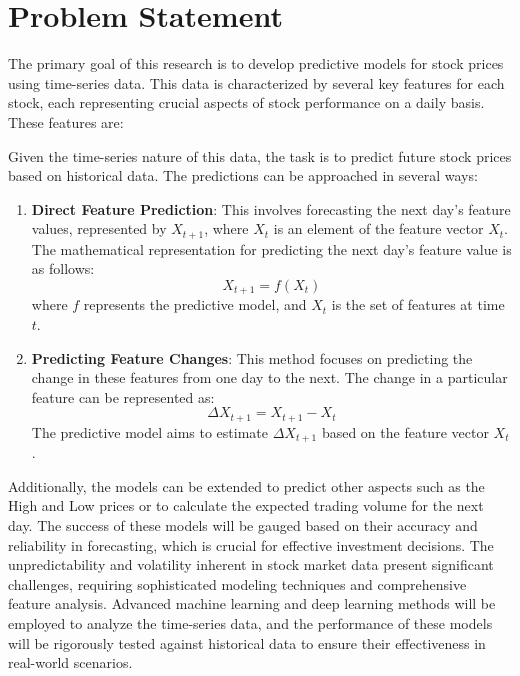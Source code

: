 \documentclass[10pt,twocolumn,letterpaper]{article}
\begin{document}
\section{Problem Statement}
\label{sec:ps}
The primary goal of this research is to develop predictive models for stock prices using time-series data.
This data is characterized by several key features for each stock, each representing crucial aspects of stock performance on a daily basis.
These features are:

Given the time-series nature of this data, the task is to predict future stock prices based on historical data.
The predictions can be approached in several ways:

\begin{enumerate}
	\item \textbf{Direct Feature Prediction}: This involves forecasting the next day's feature values, represented by \( X_{t+1} \), where \( X_{t} \) is an element of the feature vector \( X_{t} \).
	      The mathematical representation for predicting the next day's feature value is as follows:
	      \[
		      X_{t+1} = f(X_t)
	      \]
	      where \( f \) represents the predictive model, and \( X_t \) is the set of features at time \( t \).

	\item \textbf{Predicting Feature Changes}: This method focuses on predicting the change in these features from one day to the next.
	      The change in a particular feature can be represented as:
	      \[
		      \Delta X_{t+1} = X_{t+1} - X_t
	      \]
	      The predictive model aims to estimate \( \Delta X_{t+1} \) based on the feature vector \( X_t \).
\end{enumerate}

Additionally, the models can be extended to predict other aspects such as the High and Low prices or to calculate the expected trading volume for the next day.
The success of these models will be gauged based on their accuracy and reliability in forecasting, which is crucial for effective investment decisions.
The unpredictability and volatility inherent in stock market data present significant challenges, requiring sophisticated modeling techniques and comprehensive feature analysis.
Advanced machine learning and deep learning methods will be employed to analyze the time-series data, and the performance of these models will be rigorously tested against historical data to ensure their effectiveness in real-world scenarios.

\end{document}

